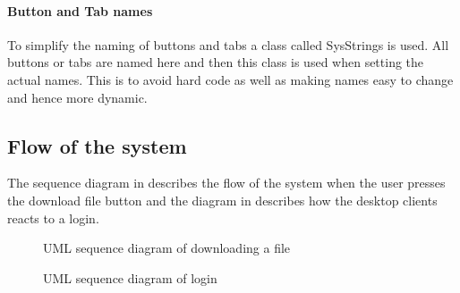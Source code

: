 \paragraph{Button and Tab names}
\label{Button and Tab names}
To simplify the naming of buttons and tabs a class called SysStrings is used. All buttons or tabs are named here and then this class is used when setting the actual names. This is to avoid hard code as well as making names easy to change and hence more dynamic.

\subsection{Flow of the system}

The sequence diagram in  describes the flow of the system when the user presses the download file button and the diagram in  describes how the desktop clients reacts to a login.

\begin{figure}[htb!]
	\caption{UML sequence diagram of downloading a file}
	\label{fig:des_download-sequence}
\end{figure}

\begin{figure}[htb!]
	\caption{UML sequence diagram of login}
	\label{fig:des_login-sequence}
\end{figure}
\FloatBarrier
